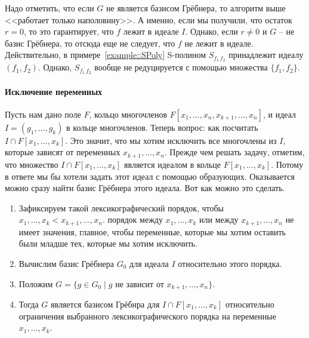 Надо отметить, что если $G$ не является базисом Грёбнера, то алгоритм выше <<работает только наполовину>>.
А именно, если мы получили, что остаток $r = 0$, то это гарантирует, что $f$ лежит в идеале $I$.
Однако, если $r \neq 0$ и $G$ -- не базис Грёбнера, то отсюда еще не следует, что $f$ не лежит в идеале.
Действительно, в примере~\ref{example::SPoly} S-полином $S_{f_1\,f_2}$ принадлежит идеалу $(f_1, f_2)$.
Однако, $S_{f_1\,f_2}$ вообще не редуцируется с помощью множества $\{f_1,f_2\}$.

\paragraph{Исключение переменных}

Пусть нам дано поле $F$, кольцо многочленов $F[x_1,\ldots,x_n, x_{k+1}, \ldots, x_n]$, и идеал $I = (g_1,\ldots,g_k)$ в кольце многочленов.
Теперь вопрос: как посчитать $I\cap F[x_1,\ldots,x_k]$.
Это значит, что мы хотим исключить все многочлены из $I$, которые зависят от переменных $x_{k+1},\ldots,x_n$.
Прежде чем решать задачу, отметим, что множество  $I\cap F[x_1,\ldots,x_k]$ является идеалом в кольце $F[x_1,\ldots,x_k]$.
Потому в ответе мы бы хотели задать этот идеал с помощью образующих.
Оказывается можно сразу найти базис Грёбнера этого идеала.
Вот как можно это сделать.
\begin{enumerate}
\item  Зафиксируем такой лексикографический порядок, чтобы $x_1,\ldots,x_k < x_{k+1},\ldots,x_n$.
порядок между $x_1,\ldots,x_k$ или между $x_{k+1},\ldots,x_n$ не имеет значения, главное, чтобы переменные, которые мы хотим оставить были младше тех, которые мы хотим исключить.

\item Вычислим базис Грёбнера $G_0$ для идеала $I$ относительно этого порядка.

\item Положим $G = \{g\in G_0\mid g \text{ не зависит от } x_{k+1},\ldots,x_n\}$.

\item Тогда $G$ является базисом Грёбнра для $I\cap F[x_1,\ldots,x_k]$ относительно ограничения выбранного лексикографического порядка на переменные $x_1,\ldots,x_k$.
\end{enumerate}
